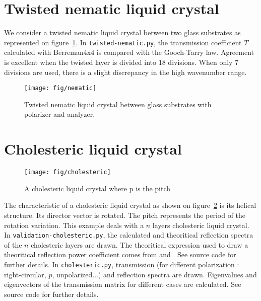 \section{Twisted nematic liquid crystal}
We consider a twisted nematic liquid crystal between two glass substrates as represented on figure~\ref{fig:nematic}.  
In \verb/twisted-nematic.py/, the transmission coefficient $T$ calculated with Berreman4x4 is compared with the Gooch-Tarry law.
Agreement is excellent when the twisted layer is divided into 18 divisions.
When only 7 divisions are used, there is a slight discrepancy in the high wavenumber range.

\begin{figure}[!h]
\begin{center}
\texttt{[image: fig/nematic]}
\caption{\label{fig:nematic} Twisted nematic liquid crystal between glass substrates with polarizer and analyzer.}
\end{center}
\end{figure}

\section{Cholesteric liquid crystal}
\begin{figure}[!h]
\begin{center}
\texttt{[image: fig/cholesteric]}
\end{center}
\caption{\label{fig:cholesteric}A cholesteric liquid crystal where p is the pitch}
\end{figure}
The characteristic of a cholesteric liquid crystal as shown on figure~\ref{fig:cholesteric} is its helical structure. Its director vector is rotated. The pitch represents the period of the rotation variation.
This example deals with a $n$ layers cholesteric liquid crystal. In \verb/validation-cholesteric.py/, the calculated and theoritical reflection spectra of the $n$ cholesteric layers are drawn. The theoritical expression used to draw a theoritical reflection power coefficient comes from \cite{Yang} and \cite{Chandrasekhar}. See source code for further details. In \verb/cholesteric.py/, transmission (for different polarization : right-circular, $p$, unpolarized...) and reflection spectra are drawn. Eigenvalues and eigenvectors of the transmission matrix for different cases are calculated. See source code for further details. 

